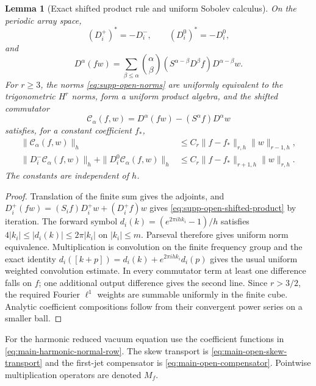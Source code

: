 \documentclass[11pt]{article}
\numberwithin{equation}{section}
\newtheorem{lemma}[lemma]{Lemma}
\theoremstyle{definition}
\theoremstyle{remark}
\begin{document}
\begin{lemma}[Exact shifted product rule and uniform Sobolev calculus]
\label{lem:supp-open-calculus}
On the periodic array space,
\begin{equation}
 (D_i^+)^*=-D_i^-,\qquad (D_i^0)^*=-D_i^0,
 \label{eq:supp-open-adjoints}
\end{equation}
and
\begin{equation}
 D^\alpha(fw)=\sum_{\beta\le\alpha}\binom\alpha\beta
 (S^{\alpha-\beta}D^\beta f)D^{\alpha-\beta}w.
 \label{eq:supp-open-shifted-product}
\end{equation}
For $r\ge3$, the norms \eqref{eq:supp-open-norms} are uniformly equivalent
to the trigonometric $H^r$ norms, form a uniform product algebra, and the
shifted commutator
\begin{equation}
 \mathcal C_\alpha(f,w)=D^\alpha(fw)-(S^\alpha f)D^\alpha w
 \label{eq:supp-open-commutator}
\end{equation}
satisfies, for a constant coefficient $f_*$,
\begin{align}
 \|\mathcal C_\alpha(f,w)\|_h
 &\le C_r\|f-f_*\|_{r,h}\|w\|_{r-1,h},\\
 \|D_i^-\mathcal C_\alpha(f,w)\|_h
 +\|D_i^0\mathcal C_\alpha(f,w)\|_h
 &\le C_r\|f-f_*\|_{r+1,h}\|w\|_{r,h}.
 \label{eq:supp-open-commutator-bounds}
\end{align}
The constants are independent of $h$.
\end{lemma}
\begin{proof}
Translation of the finite sum gives the adjoints, and
$D_i^+(fw)=(S_if)D_i^+w+(D_i^+f)w$ gives
\eqref{eq:supp-open-shifted-product} by iteration.  The forward symbol
$d_i(k)=(e^{2\pi ihk_i}-1)/h$ satisfies
$4|k_i|\le|d_i(k)|\le2\pi|k_i|$ on $|k_i|\le m$.  Parseval therefore gives
uniform norm equivalence.  Multiplication is convolution on the finite
frequency group and the exact identity
$d_i([k+p])=d_i(k)+e^{2\pi ihk_i}d_i(p)$ gives the usual uniform weighted
convolution estimate.  In every commutator term at least one difference falls
on $f$; one additional output difference gives the second line.  Since
$r>3/2$, the required Fourier $\ell^1$ weights are summable uniformly in the
finite cube.  Analytic coefficient compositions follow from their convergent
power series on a smaller ball.
\end{proof}

For the harmonic reduced vacuum equation use the coefficient functions in
\eqref{eq:main-harmonic-normal-row}.  The skew transport is
\eqref{eq:main-open-skew-transport} and the first-jet compensator is
\eqref{eq:main-open-compensator}.  Pointwise multiplication operators are
denoted $M_f$.
\end{document}
